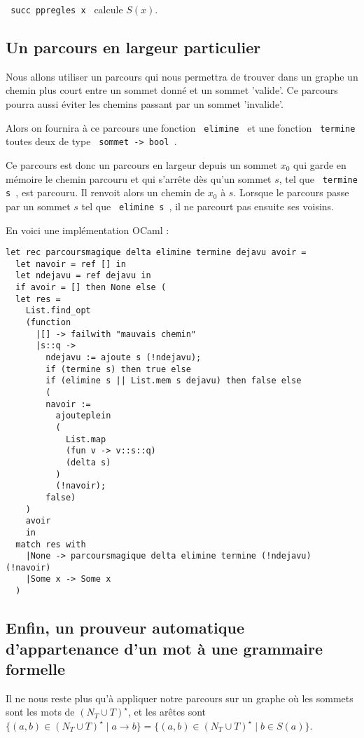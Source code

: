\documentclass[a4paper,12pt]{article}
\begin{document}
\texttt{ succ ppregles x } calcule $S(x)$.

\subsection{Un parcours en largeur particulier}
Nous allons utiliser un parcours qui nous permettra de trouver dans un graphe un chemin plus court entre un sommet donné et un sommet 'valide'.
Ce parcours pourra aussi éviter les chemins passant par un sommet 'invalide'.

Alors on fournira à ce parcours une fonction \texttt{ elimine } et une fonction \texttt{ termine } toutes deux de type \texttt{ sommet -> bool }.

Ce parcours est donc un parcours en largeur depuis un sommet $x_0$ qui garde en mémoire le chemin parcouru et qui s'arrête dès qu'un 
sommet $s$, tel que \texttt{ termine s }, est parcouru. Il renvoit alors un chemin de $x_0$ à $s$. Lorsque le parcours passe par un sommet $s$ tel que \texttt{ elimine s }, 
il ne parcourt pas ensuite ses voisins.

En voici une implémentation OCaml :

{\color{DarkBlue}\begin{verbatim}
let rec parcoursmagique delta elimine termine dejavu avoir =
  let navoir = ref [] in
  let ndejavu = ref dejavu in
  if avoir = [] then None else (
  let res = 
    List.find_opt
    (function
      |[] -> failwith "mauvais chemin"
      |s::q ->
        ndejavu := ajoute s (!ndejavu);
        if (termine s) then true else
        if (elimine s || List.mem s dejavu) then false else
        (
        navoir := 
          ajouteplein
          (
            List.map
            (fun v -> v::s::q)
            (delta s)
          )
          (!navoir);
        false)
    )
    avoir
    in
  match res with
    |None -> parcoursmagique delta elimine termine (!ndejavu) (!navoir)
    |Some x -> Some x
  )
\end{verbatim}}

\subsection{Enfin, un prouveur automatique d'appartenance d'un mot à une grammaire formelle}

Il ne nous reste plus qu'à appliquer notre parcours sur un graphe où les sommets sont les mots de $(N_T \cup T)^\star$, et les
arêtes sont $\{(a,b) \in  (N_T \cup T)^\star \mid a \rightarrow b\} = \{(a,b) \in  (N_T \cup T)^\star \mid b \in S(a)\}$.
\end{document}
